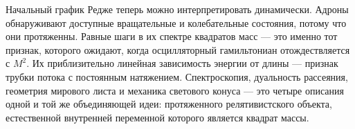 \begin{classroomqa}
\end{classroomqa}

Начальный график Редже теперь можно интерпретировать динамически. Адроны обнаруживают доступные вращательные и колебательные состояния, потому что они протяженны. Равные шаги в их спектре квадратов масс — это именно тот признак, которого ожидают, когда осцилляторный гамильтониан отождествляется с \(M^2\). Их приблизительно линейная зависимость энергии от длины — признак трубки потока с постоянным натяжением. Спектроскопия, дуальность рассеяния, геометрия мирового листа и механика светового конуса — это четыре описания одной и той же объединяющей идеи: протяженного релятивистского объекта, естественной внутренней переменной которого является квадрат массы.
